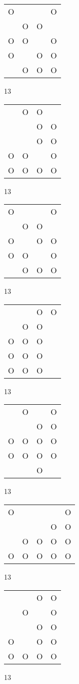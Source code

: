 \begin{tabular}{|m{0.2cm}m{0.2cm}m{0.2cm}m{0.2cm}|}\hline
O& & &O\\
 &O&O& \\
O&O& &O\\
O& &O&O\\
 &O&O&O\\
\hline\end{tabular}13
\begin{tabular}{|m{0.2cm}m{0.2cm}m{0.2cm}m{0.2cm}|}\hline
 &O&O& \\
 & &O&O\\
 & &O&O\\
O&O& &O\\
O&O&O&O\\
\hline\end{tabular}13
\begin{tabular}{|m{0.2cm}m{0.2cm}m{0.2cm}m{0.2cm}|}\hline
O& & &O\\
 &O&O& \\
O& &O&O\\
O&O& &O\\
 &O&O&O\\
\hline\end{tabular}13
\begin{tabular}{|m{0.2cm}m{0.2cm}m{0.2cm}m{0.2cm}|}\hline
 & &O&O\\
 &O&O& \\
O&O&O& \\
O&O&O& \\
O&O&O& \\
\hline\end{tabular}13
\begin{tabular}{|m{0.2cm}m{0.2cm}m{0.2cm}m{0.2cm}|}\hline
 &O& &O\\
 & &O&O\\
O&O&O&O\\
O&O&O&O\\
 & &O& \\
\hline\end{tabular}13
\begin{tabular}{|m{0.2cm}m{0.2cm}m{0.2cm}m{0.2cm}m{0.2cm}|}\hline
O& & & &O\\
 & & &O&O\\
 &O&O&O&O\\
O&O&O&O&O\\
\hline\end{tabular}13
\begin{tabular}{|m{0.2cm}m{0.2cm}m{0.2cm}m{0.2cm}|}\hline
 & &O&O\\
 &O& &O\\
 & &O&O\\
O& &O&O\\
O&O&O&O\\
\hline\end{tabular}13

